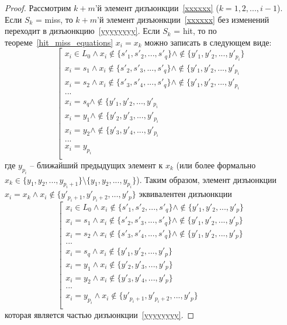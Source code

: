 \begin{proof}
  Рассмотрим $k+m$'й элемент дизъюнкции~\ref{xxxxxx} ($k = 1, 2, ...,
  i-1$).
  Если $S_k$ = miss, то $k+m$'й элемент дизъюнкции~\ref{xxxxxx} без
  изменений переходит в дизъюнкцию~\ref{yyyyyyyy}. Если $S_k$ = hit, то
  по теореме~\ref{hit_miss_equations} $x_i = x_k$ можно записать в
  следующем виде:
  $$\left[\begin{array}{l}
  x_i \in L_0 \wedge x_i \notin \{s'_1, s'_2, ..., s'_q\} \wedge \notin \{y'_1, y'_2, ..., y'_{p_i}\}\\
  x_i = s_1 \wedge x_i \notin \{s'_2, s'_3, ..., s'_q\}  \wedge \notin \{y'_1, y'_2, ..., y'_{p_i}\\
  x_i = s_2 \wedge x_i \notin \{s'_3, s'_4, ..., s'_q\}  \wedge \notin \{y'_1, y'_2, ..., y'_{p_i}\\
  ...\\
  x_i = s_q  \wedge \notin \{y'_1, y'_2, ..., y'_{p_i} \\
  x_i = y_1  \wedge \notin \{y'_2, y'_3, ..., y'_{p_i}\\
  x_i = y_2  \wedge \notin \{y'_3, y'_4, ..., y'_{p_i}\\
  ...\\
  x_i = y_{p_i}\\
  \end{array} \right.
  $$
  где $y_{p_i}$ -- ближайший предыдущих элемент к $x_k$ (или более
  формально $x_k \in \{y_1, y_2, ..., y_{p_i+1}\} \setminus \{y_1, y_2, ...,
  y_{p_i}\}$). Таким образом, элемент дизъюнкции $x_i = x_k \wedge x_i
  \notin \{y'_{p_i+1}, y'_{p_i+2}, \dots, y'_p\}$ эквивалентен дизъюнкции
  $$\left[\begin{array}{l}
  x_i \in L_0 \wedge x_i \notin \{s'_1, s'_2, ..., s'_q\} \wedge \notin \{y'_1, y'_2, ..., y'_p\}\\
  x_i = s_1 \wedge x_i \notin \{s'_2, s'_3, ..., s'_q\}  \wedge \notin \{y'_1, y'_2, ..., y'_p\}\\
  x_i = s_2 \wedge x_i \notin \{s'_3, s'_4, ..., s'_q\}  \wedge \notin \{y'_1, y'_2, ..., y'_p\}\\
  ...\\
  x_i = s_q  \wedge x_i \notin \{y'_1, y'_2, ..., y'_p\} \\
  x_i = y_1  \wedge x_i \notin \{y'_2, y'_3, ..., y'_p\}\\
  x_i = y_2  \wedge x_i \notin \{y'_3, y'_4, ..., y'_p\}\\
  ...\\
  x_i = y_{p_i} \wedge x_i \notin \{y'_{p_i+1}, y'_{p_i+2}, ..., y'_p\}\\
  \end{array} \right.
  $$
  которая является частью дизъюнкции~\ref{yyyyyyyy}.


\end{proof}
